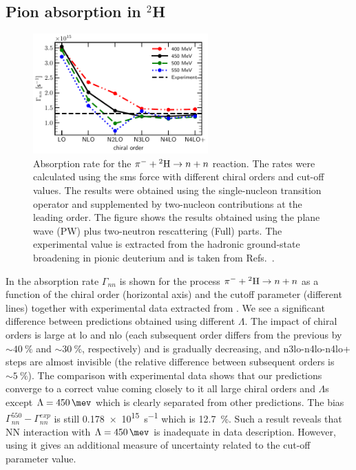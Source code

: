 \subsection{Pion absorption in $^2$H}


\begin{figure}[h]
        \begin{center}
        \includegraphics[width=0.6\textwidth]{PlotData/PION/Dalitz_maps/figures/Gamma_nn.pdf}
        \end{center}
        \caption{
            Absorption rate for the $\pi^- + {^2{\rm H}} \rightarrow n + n$ reaction.
            The rates were calculated using the \gls{sms} force with different chiral orders and cut-off values.
            The results were obtained using the single-nucleon transition operator and 
            supplemented by two-nucleon contributions at the leading order.
            The figure shows the results obtained using the plane wave (PW) plus
            two-neutron rescattering (Full) parts.
            The experimental value is extracted from the hadronic
            ground-state broadening in pionic deuterium and is taken from Refs.~\cite{Strauch2010,Strauch2011}.}
        \label{Gamma_nn}
    \end{figure}

    In  the absorption rate $\Gamma_{nn}$ is shown for the process $\pi^- + {^2{\rm H}} \rightarrow n + n$
    as a function of the chiral order (horizontal axis) and the cutoff parameter (different lines) 
    together with experimental data extracted from \cite{Strauch2010,Strauch2011}.
    We see a significant difference between
    predictions obtained using different $\Lambda$. The impact of chiral orders is large at \gls{lo}
    and \gls{nlo} (each subsequent order differs from the previous 
    by $\sim\SI{40}{\percent}$ and $\sim\SI{30}{\percent}$, respectively) 
    and is gradually decreasing, and \gls{n3lo}-\gls{n4lo}-\gls{n4lo+} steps are almost invisible
    (the relative difference between subsequent orders is $\sim\SI{5}{\percent}$).
    The comparison with experimental data shows that our predictions converge to a correct value coming 
    closely to it all large chiral orders and $\Lambda$s except $\Lambda = \SI{450}{\mev}$ 
    which is clearly separated from other predictions. The bias $\Gamma^{550}_{nn} - \Gamma^{exp}_{nn}$
    is still \SI{0.178e15}{s^{-1}} which is \SI{12.7}{\percent}.
    Such a result reveals that NN interaction with $\Lambda = \SI{450}{\mev}$  is inadequate in data description. 
    However, using it gives an additional measure of uncertainty related to the cut-off parameter value.


